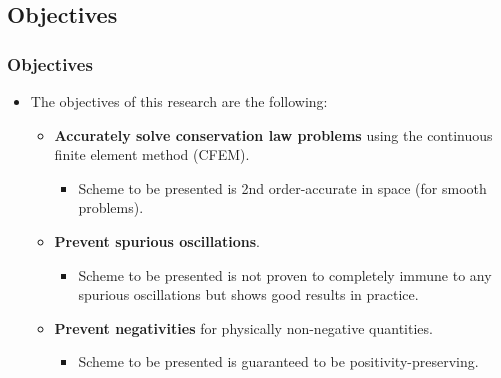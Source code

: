 \documentclass{beamer}
\begin{document}
\subsection{Objectives}
\begin{frame}
\frametitle{Objectives}

\begin{itemize}
   \item The objectives of this research are the following:
   \begin{itemize}
      \item \textbf{Accurately solve conservation law problems} using the
         continuous finite element method (CFEM).
      \begin{itemize}
         \item Scheme to be presented is 2nd order-accurate in space (for smooth problems).
      \end{itemize}
      \item \textbf{Prevent spurious oscillations}.
      \begin{itemize}
         \item Scheme to be presented is not proven to completely immune to any spurious
            oscillations but shows good results in practice.
      \end{itemize}
      \item \textbf{Prevent negativities} for physically non-negative quantities.
      \begin{itemize}
         \item Scheme to be presented is guaranteed to be positivity-preserving.
      \end{itemize}
   \end{itemize}
\end{itemize}

\end{frame}
\end{document}
